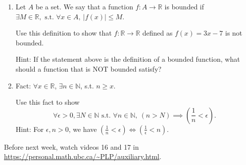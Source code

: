 \documentclass[12pt]{article}
\newcommand{\st}{\text{ s.t. }}
\begin{document}
\begin{enumerate}
Now, use this result, and the fact that $\pi\in\mathbb I$ to show
\[\forall n\in\mathbb N, \exists y\in\mathbb I \st 1/n > y > 0.\]

\item Let $A$ be a set. We say that a function $f: A\to \mathbb R$ is bounded if $\exists M\in\mathbb R, \st \forall x\in A,\  |f(x)|\leq M$.

Use this definition to show that $f:\mathbb R\to \mathbb R$ defined as $f(x)=3x-7$ is not bounded.

Hint: If the statement above is the definition of a bounded function, what should a function that is NOT bounded satisfy?

\item Fact: $\forall x\in\mathbb R$, $\exists n\in\mathbb N$, s.t. $n\geq x$.

Use this fact to show
\[\forall \epsilon>0, \exists N\in\mathbb N \st \forall n\in\mathbb N,\ (n > N) \implies \left(\dfrac{1}{n}<\epsilon \right).\] 
Hint: For $\epsilon, n>0$, we have $(\frac 1n<\epsilon) \iff (\frac{1}{\epsilon}<n)$.

\end{enumerate}

Before next week, watch videos 16 and 17 in \url{https://personal.math.ubc.ca/~PLP/auxiliary.html}.
\end{document}
